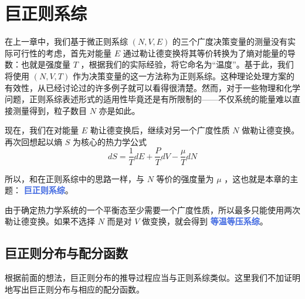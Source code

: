 
\chapter{巨正则系综}\label{cha:巨正则系综}

在上一章中，我们基于微正则系综 $(N,V,E)$ 的三个广度决策变量的测量没有实际可行性的考虑，首先对能量 $E$ 通过勒让德变换将其等价转换为了熵对能量的导数：也就是强度量 $T$ ，根据我们的实际经验，将它命名为“温度”。基于此，我们将使用 $(N,V,T)$ 作为决策变量的这一方法称为正则系综。这种理论处理方案的有效性，从已经讨论过的许多例子就可以看得很清楚。然而，对于一些物理和化学问题，正则系综表述形式的适用性毕竟还是有所限制的——不仅系统的能量难以直接测量得到，粒子数目 $N$ 亦是如此。

现在，我们在对能量 $E$ 勒让德变换后，继续对另一个广度性质 $N$ 做勒让德变换。再次回想起以熵 $S$ 为核心的热力学公式
\[
    dS = \frac{1}{T} dE + \frac{P}{T} dV - \frac{\mu}{T} dN
\]

所以，和在正则系综中的思路一样，与 $N$ 等价的强度量为 $\mu$ ，这也就是本章的主题： \textcolor{RoyalBlue}{\textbf{\kaishu 巨正则系综}}。

由于确定热力学系统的一个平衡态至少需要一个广度性质，所以最多只能使用两次勒让德变换。如果不选择 $N$ 而是对 $V$ 做变换，就会得到 \textcolor{RoyalBlue}{\textbf{\kaishu 等温等压系综}}。

\section{巨正则分布与配分函数}\label{sec:巨正则分布与配分函数}

根据前面的想法，巨正则分布的推导过程应当与正则系综类似。这里我们不加证明地写出巨正则分布与相应的配分函数。

